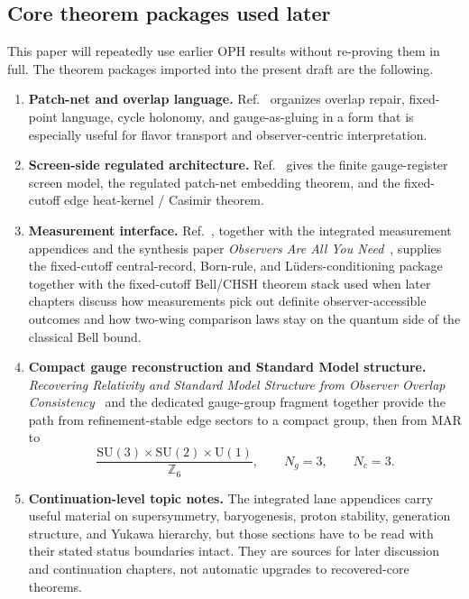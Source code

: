 \documentclass[11pt]{article}
\newcommand{\SU}{\mathrm{SU}}
\newcommand{\U}{\mathrm{U}}
\begin{document}
\subsection{Core theorem packages used later}

This paper will repeatedly use earlier OPH results without re-proving them in full. The
theorem packages imported into the present draft are the following.

\begin{enumerate}[leftmargin=2em]
\item \textbf{Patch-net and overlap language.} Ref.~\cite{ophconsensus} organizes overlap repair,
fixed-point language, cycle holonomy, and gauge-as-gluing in a form that is especially useful
for flavor transport and observer-centric interpretation.
\item \textbf{Screen-side regulated architecture.} Ref.~\cite{ophmicrophysics} gives the
finite gauge-register screen model, the regulated patch-net embedding theorem, and the fixed-cutoff
edge heat-kernel / Casimir theorem.
\item \textbf{Measurement interface.} Ref.~\cite{ophmicrophysics}, together with the integrated
measurement appendices and the synthesis paper \emph{Observers Are All You Need}~\cite{ophsynthesis}, supplies the fixed-cutoff central-record, Born-rule, and
L\"uders-conditioning package together with the fixed-cutoff Bell/CHSH theorem stack used when
later chapters discuss how measurements pick out definite observer-accessible outcomes and how
two-wing comparison laws stay on the quantum side of the classical Bell bound.
\item \textbf{Compact gauge reconstruction and Standard Model structure.}
\emph{Recovering Relativity and Standard Model Structure from Observer Overlap Consistency}~\cite{ophcompact}
and the dedicated gauge-group fragment together provide the path from refinement-stable
edge sectors to a compact group, then from MAR to
\[
\frac{\SU(3)\times\SU(2)\times\U(1)}{\mathbb Z_6},
\qquad
N_g=3,
\qquad
N_c=3.
\]
\item \textbf{Continuation-level topic notes.} The integrated lane appendices carry useful material
on supersymmetry, baryogenesis, proton stability, generation structure, and Yukawa hierarchy,
but those sections have to be read with their stated status boundaries intact. They are sources
for later discussion and continuation chapters, not automatic upgrades to recovered-core theorems.
\end{enumerate}
\end{document}
